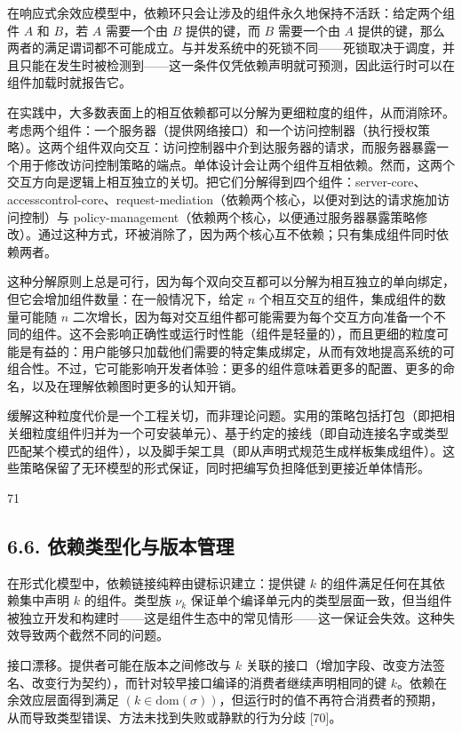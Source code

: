 在响应式余效应模型中，依赖环只会让涉及的组件永久地保持不活跃：给定两个组件 \(A\) 和 \(B\)，若 \(A\) 需要一个由 \(B\) 提供的键，而 \(B\) 需要一个由 \(A\) 提供的键，那么两者的满足谓词都不可能成立。与并发系统中的死锁不同——死锁取决于调度，并且只能在发生时被检测到——这一条件仅凭依赖声明就可预测，因此运行时可以在组件加载时就报告它。

在实践中，大多数表面上的相互依赖都可以分解为更细粒度的组件，从而消除环。考虑两个组件：一个服务器（提供网络接口）和一个访问控制器（执行授权策略）。这两个组件双向交互：访问控制器中介到达服务器的请求，而服务器暴露一个用于修改访问控制策略的端点。单体设计会让两个组件互相依赖。然而，这两个交互方向是逻辑上相互独立的关切。把它们分解得到四个组件：server-core、accesscontrol-core、request-mediation（依赖两个核心，以便对到达的请求施加访问控制）与 policy-management（依赖两个核心，以便通过服务器暴露策略修改）。通过这种方式，环被消除了，因为两个核心互不依赖；只有集成组件同时依赖两者。

这种分解原则上总是可行，因为每个双向交互都可以分解为相互独立的单向绑定，但它会增加组件数量：在一般情况下，给定 \(n\) 个相互交互的组件，集成组件的数量可能随 \(n\) 二次增长，因为每对交互组件都可能需要为每个交互方向准备一个不同的组件。这不会影响正确性或运行时性能（组件是轻量的），而且更细的粒度可能是有益的：用户能够只加载他们需要的特定集成绑定，从而有效地提高系统的可组合性。不过，它可能影响开发者体验：更多的组件意味着更多的配置、更多的命名，以及在理解依赖图时更多的认知开销。

缓解这种粒度代价是一个工程关切，而非理论问题。实用的策略包括打包（即把相关细粒度组件归并为一个可安装单元）、基于约定的接线（即自动连接名字或类型匹配某个模式的组件），以及脚手架工具（即从声明式规范生成样板集成组件）。这些策略保留了无环模型的形式保证，同时把编写负担降低到更接近单体情形。

71

\subsection{6.6. 依赖类型化与版本管理}\label{dependency-typing-and-versioning}

在形式化模型中，依赖链接纯粹由键标识建立：提供键 \(k\) 的组件满足任何在其依赖集中声明 \(k\) 的组件。类型族 \(\nu _ { k }\) 保证单个编译单元内的类型层面一致，但当组件被独立开发和构建时——这是组件生态中的常见情形——这一保证会失效。这种失效导致两个截然不同的问题。

接口漂移。提供者可能在版本之间修改与 \(k\) 关联的接口（增加字段、改变方法签名、改变行为契约），而针对较早接口编译的消费者继续声明相同的键 \(k\)。依赖在余效应层面得到满足 \(( k \in \mathrm { d o m } ( \sigma ) )\)，但运行时的值不再符合消费者的预期，从而导致类型错误、方法未找到失败或静默的行为分歧 {[}70{]}。

